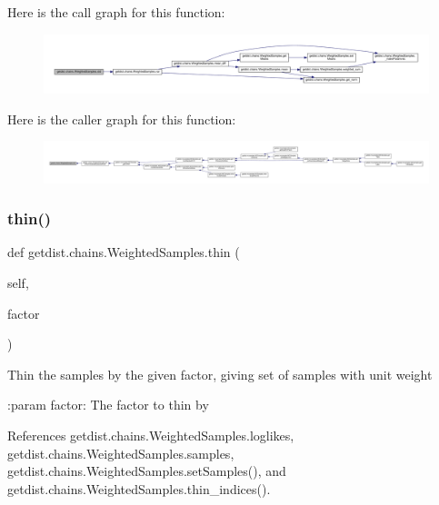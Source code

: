 Here is the call graph for this function\+:
\nopagebreak
\begin{figure}[H]
\begin{center}
\leavevmode
\includegraphics[width=350pt]{classgetdist_1_1chains_1_1WeightedSamples_aeaa6411b75fd033e7ad9761cdcbc28cf_cgraph}
\end{center}
\end{figure}
Here is the caller graph for this function\+:
\nopagebreak
\begin{figure}[H]
\begin{center}
\leavevmode
\includegraphics[width=350pt]{classgetdist_1_1chains_1_1WeightedSamples_aeaa6411b75fd033e7ad9761cdcbc28cf_icgraph}
\end{center}
\end{figure}
\mbox{\label{classgetdist_1_1chains_1_1WeightedSamples_a99cf3cd470c17389b594acbe0c02f174}} 
\subsubsection{\texorpdfstring{thin()}{thin()}}
{\footnotesize\ttfamily def getdist.\+chains.\+Weighted\+Samples.\+thin (\begin{DoxyParamCaption}\item[{}]{self,  }\item[{}]{factor }\end{DoxyParamCaption})}

\begin{DoxyVerb}Thin the samples by the given factor, giving set of samples with unit weight

:param factor: The factor to thin by
\end{DoxyVerb}
 

References getdist.\+chains.\+Weighted\+Samples.\+loglikes, getdist.\+chains.\+Weighted\+Samples.\+samples, getdist.\+chains.\+Weighted\+Samples.\+set\+Samples(), and getdist.\+chains.\+Weighted\+Samples.\+thin\+\_\+indices().

